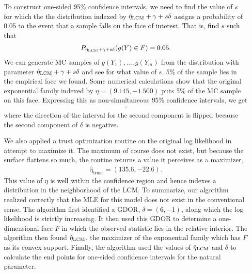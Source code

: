 To construct one-sided 95\% confidence intervals, we need to find the value of 
$s$ for which the the distribution indexed by $\hat{\eta}_{\textrm{LCM}} + \gamma + s \delta$ 
assigns a probability of 0.05 to the event that a sample falls on the 
face of interest.  That is, find $s$ such that
\begin{align*}
P_{\hat{\eta}_{\textrm{LCM}} + \gamma + s \delta}(g(Y) \in F ) = 0.05.
\end{align*}
We can generate MC samples 
of $g(Y_1), \ldots, g(Y_m)$ from the distribution with parameter $\hat{\eta}_{\textrm{LCM}} + \gamma + s 
\delta$ and see for what value of $s$, 5\% of the sample lies in the 
empirical face we found.  Some numerical calculations show that the original
 exponential family indexed by $\eta = (9.145, -1.500)$ puts 5\% of
  the MC sample on this face.  
Expressing this as non-simultaneous 95\% confidence intervals, we get
\begin{align*}
	[9.145, +\infty)\\
	(-\infty, -1.500],
\end{align*}
where the direction of the interval for the second component is flipped because the 
second component of $\delta$ is negative.

We also applied a trust optimization routine on the original log 
likelihood in attempt to maximize it.  The maximum of course does not exist, but
because the surface flattens so much, the routine returns a value it perceives as a maximizer,  
\begin{align*}
 	\hat{\eta}_{\textrm{trust}} = (135.6, -22.6).
 \end{align*}
This value of $\eta$ is well within the confidence region and hence indexes a distribution
in the neighborhood of the LCM.
To summarize, our algorithm realized correctly that the MLE for 
this model does not exist in the conventional sense.
The algorithm first identified a GDOR, $\delta = (6,-1)$, along which 
the log likelihood is strictly increasing.  It then used this GDOR to determine
a one-dimensional face $F$ in which the observed statistic lies 
in the relative interior.  The algorithm then found $\hat{\eta}_{\textrm{LCM}}$, the 
maximizer of the exponential family
which has $F$ as its convex support.  Finally, the algorithm used the
values of $\hat{\eta}_{\textrm{LCM}}$ and $\delta$ to calculate the end points for 
one-sided confidence intervals for the natural parameter.


